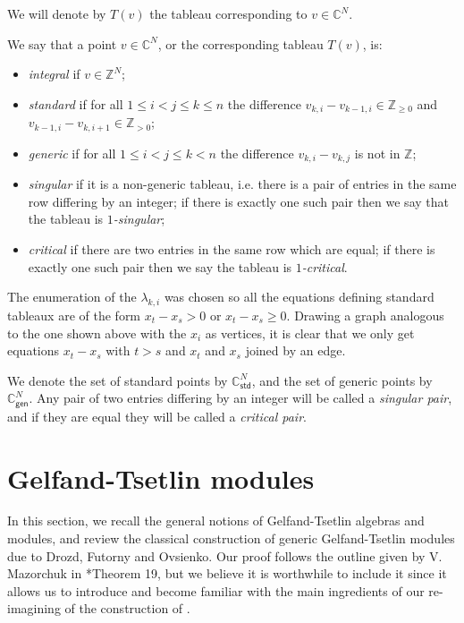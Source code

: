 \documentclass[11pt,fleqn]{article}
\newcommand\CC{\mathbb C}
\newcommand\ZZ{\mathbb Z}
\newcommand\gen{\mathsf{gen}}
\newcommand\std{\mathsf{std}}
\begin{document}
We will denote by $T(v)$ the tableau corresponding to $v \in \CC^N$.
\begin{Definition}
\label{D:various-tableaux}
We say that a point $v \in \CC^N$, or the corresponding tableau $T(v)$, is:
\begin{itemize}
\item \emph{integral} if $v \in \ZZ^{N}$;

\item \emph{standard} if for all $1 \leq i < j \leq k \leq n$ the difference 
$v_{k,i}-v_{k-1,i} \in \ZZ_{\geq 0}$ and $v_{k-1,i}-v_{k,i+1} \in \ZZ_{>0}$;

\item \emph{generic} if for all $1 \leq i < j \leq k < n$ the difference 
$v_{k,i}-v_{k,j}$ is not in $\ZZ$;

\item \emph{singular} if it is a non-generic tableau, i.e. there is a pair of 
entries in the same row differing by an integer; if there is exactly one such 
pair then we say that the tableau is \emph{$1$-singular};

\item \emph{critical} if there are two entries in the same row which are 
equal; if there is exactly one such pair then we say the tableau is
\emph{$1$-critical}.
\end{itemize}
\end{Definition}
The enumeration of the $\lambda_{k,i}$ was chosen so all the equations defining
standard tableaux are of the form $x_t - x_s > 0$ or $x_t - x_s \geq 0$. 
Drawing a graph analogous to the one shown above with the $x_i$ as vertices, 
it is clear that we only get equations $x_t - x_s$ with $t>s$ and $x _t$ and 
$x_s$ joined by an edge.

We denote the set of standard points by $\CC^N_\std$, and the set of generic 
points by $\CC^N_\gen$. Any pair of two entries differing by an integer will
be called a \emph{singular pair}, and if they are equal they will be called
a \emph{critical pair}. 

\section{Gelfand-Tsetlin modules}
In this section, we recall the general notions of Gelfand-Tsetlin algebras and 
modules, and review the classical construction of generic Gelfand-Tsetlin 
modules due to Drozd, Futorny and Ovsienko. Our proof follows the outline 
given by V. Mazorchuk in \cite{Maz-GT-cats}*{Theorem 19}, but we believe it is 
worthwhile to include it since it allows us to introduce and become familiar 
with the main ingredients of our re-imagining of the construction of 
\cite{FGR-singular-gt}.
\end{document}

